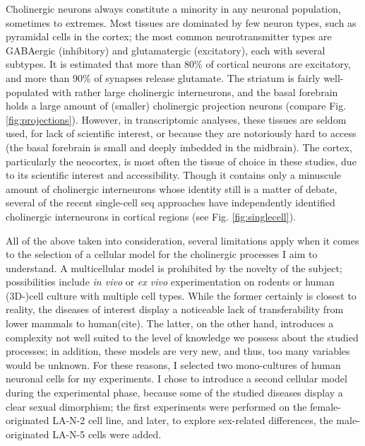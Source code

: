 Cholinergic neurons always constitute a minority in any neuronal population, sometimes to extremes. Most tissues are dominated by few neuron types, such as pyramidal cells in the cortex; the most common neurotransmitter types are GABAergic (inhibitory) and glutamatergic (excitatory), each with several subtypes. It is estimated that more than 80\% of cortical neurons are excitatory, and more than 90\% of synapses release glutamate\cite{Raichle2002}. The striatum is fairly well-populated with rather large cholinergic interneurons, and the basal forebrain holds a large amount of (smaller) cholinergic projection neurons (compare Fig. \ref{fig:projections}). However, in transcriptomic analyses, these tissues are seldom used, for lack of scientific interest, or because they are notoriously hard to access (the basal forebrain is small and deeply imbedded in the midbrain). The cortex, particularly the neocortex, is most often the tissue of choice in these studies, due to its scientific interest and accessibility. Though it contains only a minuscule amount of cholinergic interneurons whose identity still is a matter of debate, several of the recent single-cell \ac{seq} approaches have independently identified cholinergic interneurons in cortical regions (see Fig. \ref{fig:singlecell}). 

All of the above taken into consideration, several limitations apply when it comes to the selection of a cellular model for the cholinergic processes I aim to understand. A multicellular model is prohibited by the novelty of the subject; possibilities include \textit{in vivo} or \textit{ex vivo} experimentation on rodents or human (3D-)cell culture with multiple cell types. While the former certainly is closest to reality, the diseases of interest display a noticeable lack of transferability from lower mammals to human(cite). The latter, on the other hand, introduces a complexity not well suited to the level of knowledge we possess about the studied processes; in addition, these models are very new, and thus, too many variables would be unknown. For these reasons, I selected two mono-cultures of human neuronal cells for my experiments. I chose to introduce a second cellular model during the experimental phase, because some of the studied diseases display a clear sexual dimorphism; the first experiments were performed on the female-originated LA-N-2 cell line, and later, to explore sex-related differences, the male-originated LA-N-5 cells were added.

